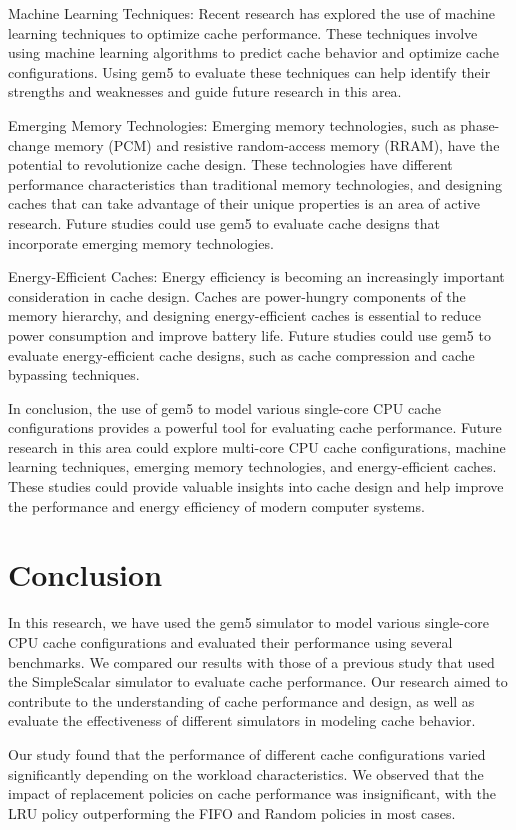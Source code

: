 \documentclass[conference]{IEEEtran}
\begin{document}
Machine Learning Techniques: Recent research has explored the use of machine learning techniques to optimize cache performance. These techniques involve using machine learning algorithms to predict cache behavior and optimize cache configurations. Using gem5 to evaluate these techniques can help identify their strengths and weaknesses and guide future research in this area.

Emerging Memory Technologies: Emerging memory technologies, such as phase-change memory (PCM) and resistive random-access memory (RRAM), have the potential to revolutionize cache design. These technologies have different performance characteristics than traditional memory technologies, and designing caches that can take advantage of their unique properties is an area of active research. Future studies could use gem5 to evaluate cache designs that incorporate emerging memory technologies.

Energy-Efficient Caches: Energy efficiency is becoming an increasingly important consideration in cache design. Caches are power-hungry components of the memory hierarchy, and designing energy-efficient caches is essential to reduce power consumption and improve battery life. Future studies could use gem5 to evaluate energy-efficient cache designs, such as cache compression and cache bypassing techniques.

In conclusion, the use of gem5 to model various single-core CPU cache configurations provides a powerful tool for evaluating cache performance. Future research in this area could explore multi-core CPU cache configurations, machine learning techniques, emerging memory technologies, and energy-efficient caches. These studies could provide valuable insights into cache design and help improve the performance and energy efficiency of modern computer systems.

\section{Conclusion}
In this research, we have used the gem5 simulator to model various single-core CPU cache configurations and evaluated their performance using several benchmarks. We compared our results with those of a previous study that used the SimpleScalar simulator to evaluate cache performance. Our research aimed to contribute to the understanding of cache performance and design, as well as evaluate the effectiveness of different simulators in modeling cache behavior.

Our study found that the performance of different cache configurations varied significantly depending on the workload characteristics. We observed that the impact of replacement policies on cache performance was insignificant, with the LRU policy outperforming the FIFO and Random policies in most cases.
\end{document}
